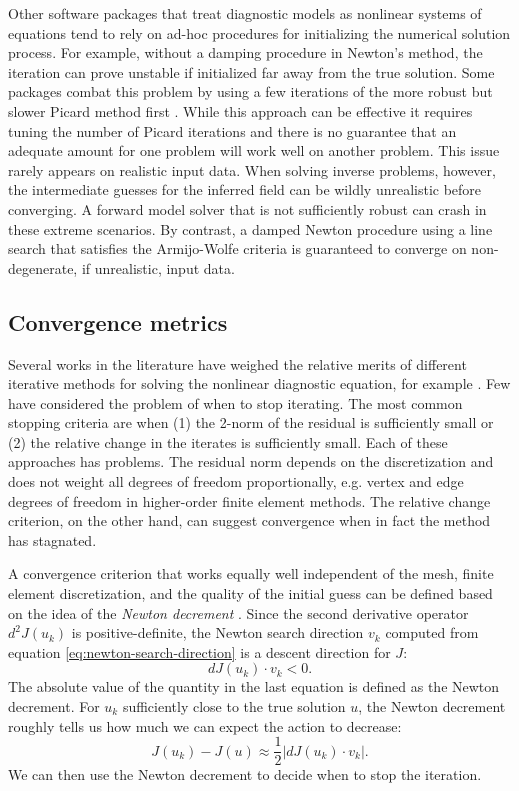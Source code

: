 \documentclass[journal abbreviation, manuscript]{copernicus}
\begin{document}
Other software packages that treat diagnostic models as nonlinear systems of equations tend to rely on ad-hoc procedures for initializing the numerical solution process.
For example, without a damping procedure in Newton's method, the iteration can prove unstable if initialized far away from the true solution.
Some packages combat this problem by using a few iterations of the more robust but slower Picard method first \citep{gagliardini2013capabilities}.
While this approach can be effective it requires tuning the number of Picard iterations and there is no guarantee that an adequate amount for one problem will work well on another problem.
This issue rarely appears on realistic input data.
When solving inverse problems, however, the intermediate guesses for the inferred field can be wildly unrealistic before converging.
A forward model solver that is not sufficiently robust can crash in these extreme scenarios.
By contrast, a damped Newton procedure using a line search that satisfies the Armijo-Wolfe criteria is guaranteed to converge on non-degenerate, if unrealistic, input data.


\subsection{Convergence metrics} \label{sec:convergence-criteria}

Several works in the literature have weighed the relative merits of different iterative methods for solving the nonlinear diagnostic equation, for example \citet{perego2012parallel}.
Few have considered the problem of when to stop iterating.
The most common stopping criteria are when (1) the 2-norm of the residual is sufficiently small or (2) the relative change in the iterates is sufficiently small.
Each of these approaches has problems.
The residual norm depends on the discretization and does not weight all degrees of freedom proportionally, e.g. vertex and edge degrees of freedom in higher-order finite element methods.
The relative change criterion, on the other hand, can suggest convergence when in fact the method has stagnated.

A convergence criterion that works equally well independent of the mesh, finite element discretization, and the quality of the initial guess can be defined based on the idea of the \emph{Newton decrement} \citep{nocedal2006numerical}.
Since the second derivative operator $d^2J(u_k)$ is positive-definite, the Newton search direction $v_k$ computed from equation \eqref{eq:newton-search-direction} is a descent direction for $J$:
\begin{equation}
    dJ(u_k)\cdot v_k < 0.
\end{equation}
The absolute value of the quantity in the last equation is defined as the Newton decrement.
For $u_k$ sufficiently close to the true solution $u$, the Newton decrement roughly tells us how much we can expect the action to decrease:
\begin{equation}
    J(u_k) - J(u) \approx \frac{1}{2}|dJ(u_k)\cdot v_k|.
\end{equation}
We can then use the Newton decrement to decide when to stop the iteration.
\end{document}
